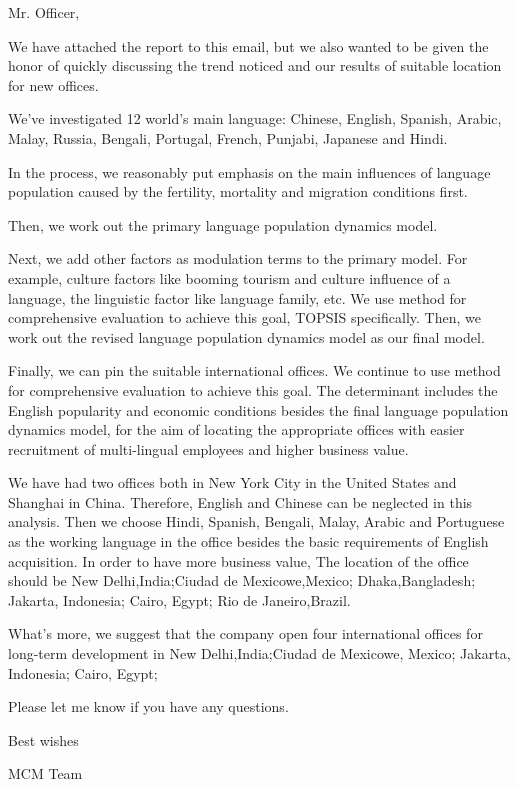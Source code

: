 \documentclass{mcmthesis}
\begin{document}
Mr. Officer,

We have attached the report to this email, but we also wanted to be given the honor of quickly discussing the trend noticed and our results of suitable location for new offices.

We've investigated 12 world's main language: Chinese, English, Spanish, Arabic, Malay, Russia, Bengali, Portugal, French, Punjabi, Japanese and Hindi.

In the process, we reasonably put emphasis on the main influences of language population caused by the fertility, mortality and migration conditions first.

Then, we work out the primary language population dynamics model.

Next, we add other factors as modulation terms to the primary model. For example, culture factors like booming tourism and culture influence of a language, the linguistic factor like language family, etc. We use method for comprehensive evaluation to achieve this goal, TOPSIS specifically. Then, we work out the revised language population dynamics model as our final model.

Finally, we can pin the suitable international offices. We continue to use method for comprehensive evaluation to achieve this goal. The determinant includes the English popularity and economic conditions besides the final language population dynamics model, for the aim of locating the appropriate offices with easier recruitment of multi-lingual employees and higher business value.

We have had two offices both in New York City in the United States and Shanghai in China. Therefore, English and Chinese can be neglected in this analysis. Then we choose Hindi, Spanish, Bengali, Malay, Arabic and Portuguese as the working language in the office besides the basic requirements of English acquisition. In order to have more business value, The location of the office should be New Delhi,India;Ciudad de Mexicowe,Mexico; Dhaka,Bangladesh; Jakarta, Indonesia; Cairo, Egypt; Rio de Janeiro,Brazil.

What's more, we suggest that the company open four international offices for long-term development in New Delhi,India;Ciudad de Mexicowe, Mexico; Jakarta, Indonesia; Cairo, Egypt;

Please let me know if you have any questions.

Best wishes

MCM Team
\end{document}

